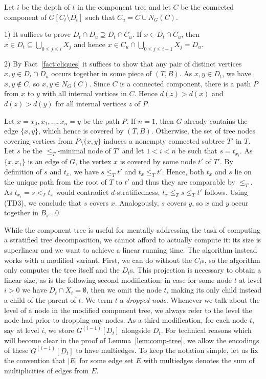 \documentclass{LMCS}
\begin{document}
\proof 
Let $i$ be the depth of $t$ in the component tree and let $C$ be the
connected component of $G[C_t\setminus D_t]$ 
such that $C_u=C\cup N_{G}(C)$.

1) It suffices to prove $D_t\cap D_u\supseteq D_t\cap C_u$.  If $x\in D_t\cap
C_u$, then $x\in D_t\subseteq \bigcup_{0\leq j\leq i}X_j$ and hence $x\in
C_u\cap \bigcup_{0\leq j\leq i+1}X_j=D_u$.

2) By Fact~\ref{fact:cliques} 
  it suffices to show that any pair of distinct vertices $x,y\in D_t\cap D_u$
occurs together in some piece of $(T,B)$.  As $x,y\in D_t$, we have $x,y\not\in
C$, so $x,y\in N_{G}(C)$. 
Since $C$ is a connected component, there is a path $P$
from $x$ to $y$ with all internal vertices in $C$.  Hence $d(z)>d(x)$ and
$d(z)>d(y)$ for all internal vertices $z$ of $P$. 

Let $x=x_0,x_1,\ldots,x_n=y$ be the path $P$.  If $n=1$, then $G$
already contains the edge $\{x,y\}$, which hence is covered by $(T,B)$.
Otherwise, the set of tree nodes covering vertices from $P\setminus\{x,y\}$
induces a nonempty connected subtree $T'$ in $T$.  Let $s$ be the
$\leq_T$-minimal node of $T'$ and let $1<i<n$ be such that $s=t_{x_i}$. 
As $\{x,x_1\}$ is an edge of $G$, 
the vertex $x$ is covered by some node $t'$ of $T'$. 
By definition of $s$ and $t_x$, we have $s\leq_Tt'$ and $t_x\leq_Tt'$. 
Hence, both $t_x$ and $s$ lie on the unique path from the root of $T$
to $t'$ and thus they are comparable by $\leq_T$. 
As $t_{x_i}=s<_Tt_x$ would contradict $d$-stratifiedness, 
$t_x\leq_Ts\leq_Tt'$ follows. 
Using (TD3), we conclude that $s$ covers $x$. 
Analogously, $s$ covers $y$, so $x$ and $y$ occur together in $B_s$. 
\qed

While the component tree is useful for mentally addressing 
the task of computing a stratified tree decomposition, 
we cannot afford to actually compute it: 
its size is superlinear and we want to achieve a linear running time. 
The algorithm instead works with a modified variant. 
First, we can do without the $C_t$s, 
so the algorithm only computes the tree itself and the $D_t$s. 
This projection is necessary to obtain a linear size, 
as is the following second modification: 
in case for some node $t$ at level $i>0$ we have $D_t\cap X_i=\emptyset$, 
then we omit the node $t$, 
making its only child instead a child of the parent of $t$. 
We term $t$ a \emph{dropped node}. 
Whenever we talk about the level of a node in the modified component tree, 
we always refer to the level the node had prior to dropping any nodes. 
As a third modification, for each node $t$, say at level $i$, 
we store $G^{(i-1)}[D_t]$ alongside $D_t$. 
For technical reasons 
which will become clear in the proof of Lemma~\ref{lem:comp-tree}, 
we allow the encodings of these $G^{(i-1)}[D_t]$ to have multiedges. 
To keep the notation simple, 
let us fix the convention that $|E|$ for some edge set $E$ with multiedges 
denotes the sum of multiplicities of edges from $E$. 
\end{document}
